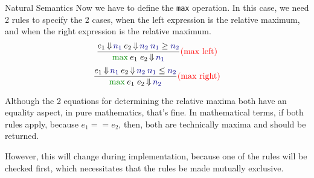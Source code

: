\begin{example}[Lecture 3]{Natural Semantics}
  Now we have to define the \texttt{max} operation.
  In this case, we need 2 rules to specify the 2 cases, when the left expression is the relative maximum, and when the right expression is the relative maximum.
  \begin{equation*}
    \frac{e_{1} \EvaluatesTo \textcolor{Blue4}{n_{1}} \: e_{2} \EvaluatesTo \textcolor{Blue4}{n_{2}} \: \textcolor{Blue4}{n_{1}} \geq \textcolor{Blue4}{n_{2}}}{\SemanticInput{\mathtt{\max}} \: e_{1} \; e_{2} \EvaluatesTo \textcolor{Blue4}{n_{1}}} \textcolor{red}{(\text{max left})}
  \end{equation*}
  \begin{equation*}
    \frac{e_{1} \EvaluatesTo \textcolor{Blue4}{n_{1}} \: e_{2} \EvaluatesTo \textcolor{Blue4}{n_{2}} \: \textcolor{Blue4}{n_{1}} \leq \textcolor{Blue4}{n_{2}}}{\SemanticInput{\mathtt{\max}} \: e_{1} \; e_{2} \EvaluatesTo \textcolor{Blue4}{n_{2}}} \textcolor{red}{(\text{max right})}
  \end{equation*}
  \begin{remark*}
    Although the 2 equations for determining the relative maxima both have an equality aspect, in pure mathematics, that's fine.
    In mathematical terms, if both rules apply, because $e_{1} == e_{2}$, then, both are technically maxima and should be returned.

    However, this will change during implementation, because one of the rules will be checked first, which necessitates that the rules be made mutually exclusive.
  \end{remark*}


\end{example}

